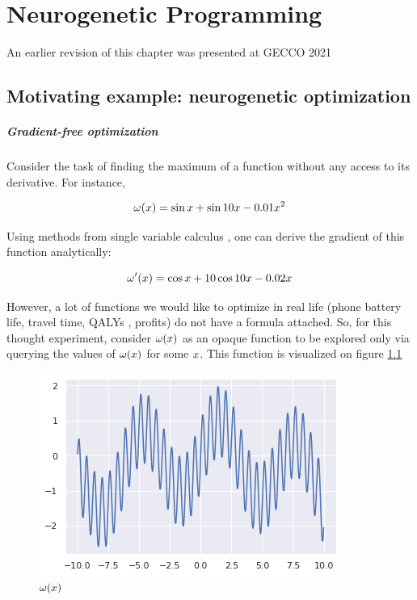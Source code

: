 \chapter{Neurogenetic Programming}\label{ch:neurogen}
\begin{remark}
    An earlier revision of this chapter \cite{liventsev2021neurogenetic,liventsevNeurogeneticProgrammingFramework2021} was presented at GECCO 2021
\end{remark}

\section{Motivating example: neurogenetic optimization}

\paragraph{Gradient-free optimization}

Consider the task of finding the maximum of a function without any access to its derivative. For instance,

\begin{equation}
\omega(x) = \sin x + \sin 10 x - 0.01 x^2
\end{equation}

Using methods from single variable calculus \cite{antonCalculusSingleVariable2021}, one can derive the gradient of this function analytically:

\begin{equation}
\omega'(x) = \cos x + 10 \cos 10 x - 0.02 x
\end{equation}

However, a lot of functions we would like to optimize in real life (phone battery life, travel time, QALYs \cite{ryenWillingnessPayQuality2015, torranceUtilitiesQualityadjustedLife1989}, profits) do not have a formula attached. 
So, for this thought experiment, consider $ \omega(x) $ as an opaque function to be explored only via querying the values of $ \omega(x) $ for some $x$.
This function is visualized on figure \ref{fig:neuropt-f}
    
\begin{figure}
    \centering
    \includegraphics[width=0.8\linewidth]{images/neuropt1.png}
    \caption{$\omega(x)$}
    \label{fig:neuropt-f}
\end{figure}

